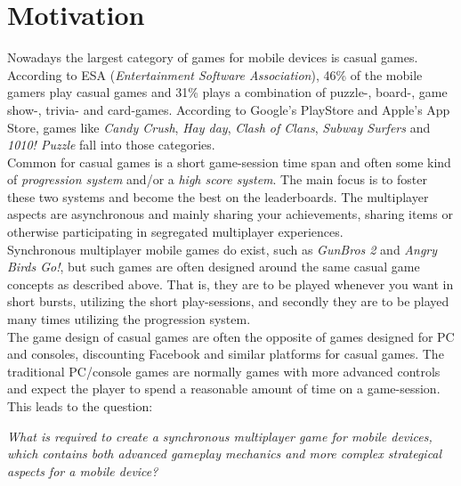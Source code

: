 \section{Motivation} \label{sec:motivation}
Nowadays the largest category of games for mobile devices is casual games. According to ESA\cite{ESA}\cite{ESApdf}
(\textit{Entertainment Software Association}), 46\% of the mobile gamers play casual games and 31\% plays a combination
of puzzle-, board-, game show-, trivia- and card-games.  According to Google's PlayStore \cite{googleplay} and Apple's
App Store\cite{appstore}, games like \textit{Candy Crush}, \textit{Hay day}, \textit{Clash of Clans}, \textit{Subway
Surfers} and \textit{1010! Puzzle} fall into those categories.\\

Common for casual games is a short game-session time span and often some kind of \textit{progression system} and/or
a \textit{high score system}. The main focus is to foster these two systems and become the best on the leaderboards.
The multiplayer aspects are asynchronous and mainly sharing your achievements, sharing items or otherwise participating
in segregated multiplayer experiences.\\

Synchronous multiplayer mobile games do exist, such as \textit{GunBros 2} and \textit{Angry Birds Go!}, but such games
are often designed around the same casual game concepts as described above. That is, they are to be played whenever
you want in short bursts, utilizing the short play-sessions, and secondly they are to be played many times utilizing
the progression system.\\

The game design of casual games are often the opposite of games designed for PC and consoles, discounting Facebook
and similar platforms for casual games. The traditional PC/console games are normally games with more advanced controls
and expect the player to spend a reasonable amount of time on a game-session. This leads to the question:
\begin{center}\label{intro:problem_statement}
\textit{What is required to create a synchronous multiplayer game for mobile devices, which contains both advanced
gameplay mechanics and more complex
strategical aspects for a mobile device?}
\end{center}


